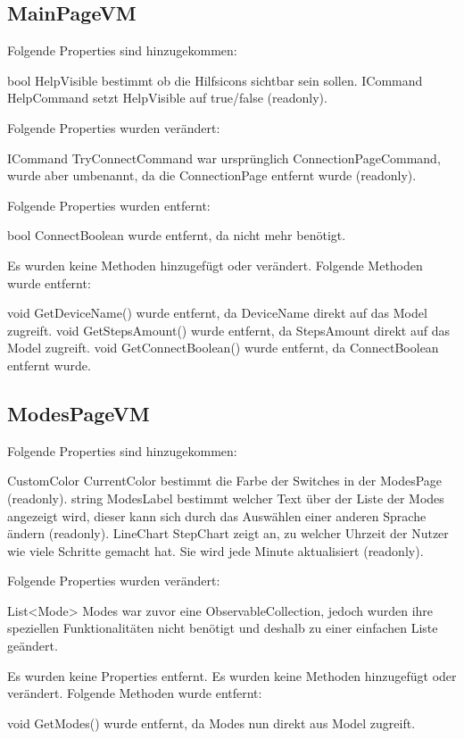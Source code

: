 \documentclass[../implementierung.tex]{subfiles}
\begin{document}
		\subsection{MainPageVM}
			Folgende Properties sind hinzugekommen:
			\begin{itemize}
				\add bool HelpVisible bestimmt ob die Hilfsicons sichtbar sein sollen.
				\add ICommand HelpCommand setzt HelpVisible auf true/false (readonly).
			\end{itemize}
			Folgende Properties wurden verändert:
			\begin{itemize}
				\changed ICommand TryConnectCommand war ursprünglich ConnectionPageCommand, wurde aber umbenannt, da die ConnectionPage entfernt wurde (readonly).
			\end{itemize}
			Folgende Properties wurden entfernt:
			\begin{itemize}
				\remove bool ConnectBoolean wurde entfernt, da nicht mehr benötigt.
			\end{itemize}
			Es wurden keine Methoden hinzugefügt oder verändert. \newline
			Folgende Methoden wurde entfernt:
			\begin{itemize}
				\remove void GetDeviceName() wurde entfernt, da DeviceName direkt auf das Model zugreift.
				\remove  void GetStepsAmount() wurde entfernt, da StepsAmount direkt auf das Model zugreift.
				\remove  void GetConnectBoolean() wurde entfernt, da ConnectBoolean entfernt wurde.
			\end{itemize}
		\subsection{ModesPageVM}
			Folgende Properties sind hinzugekommen:
			\begin{itemize}
				\add CustomColor CurrentColor bestimmt die Farbe der Switches in der ModesPage (readonly).
				\add string ModesLabel bestimmt welcher Text über der Liste der Modes angezeigt wird, dieser kann sich durch das Auswählen einer anderen Sprache ändern (readonly).
				\add LineChart StepChart zeigt an, zu welcher Uhrzeit der Nutzer wie viele Schritte gemacht hat. Sie wird jede Minute aktualisiert (readonly).
			\end{itemize}
			Folgende Properties wurden verändert:
			\begin{itemize}
				\changed List<Mode> Modes war zuvor eine ObservableCollection, jedoch wurden ihre speziellen Funktionalitäten nicht benötigt und deshalb zu einer einfachen Liste geändert.	
			\end{itemize}
			Es wurden keine Properties entfernt. \newline
			Es wurden keine Methoden hinzugefügt oder verändert. \newline
			Folgende Methoden wurde entfernt:
			\begin{itemize}
				\remove void GetModes() wurde entfernt, da Modes nun direkt aus Model zugreift.
			\end{itemize}
\end{document}
